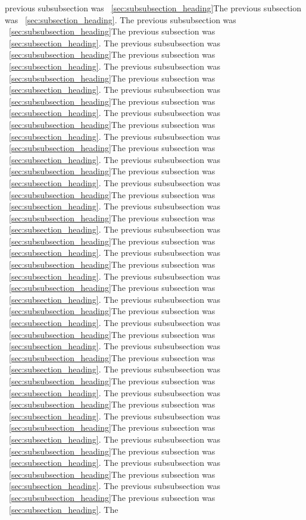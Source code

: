 \documentclass[twocolumn,11pt,twoside]{article}
\begin{document}
previous subsubsection was ~\ref{sec:subsubsection_heading}The previous subsection was ~\ref{sec:subsection_heading}.  The
previous subsubsection was ~\ref{sec:subsubsection_heading}The previous subsection was ~\ref{sec:subsection_heading}.  The
previous subsubsection was ~\ref{sec:subsubsection_heading}The previous subsection was ~\ref{sec:subsection_heading}.  The
previous subsubsection was ~\ref{sec:subsubsection_heading}The previous subsection was ~\ref{sec:subsection_heading}.  The
previous subsubsection was ~\ref{sec:subsubsection_heading}The previous subsection was ~\ref{sec:subsection_heading}.  The
previous subsubsection was ~\ref{sec:subsubsection_heading}The previous subsection was ~\ref{sec:subsection_heading}.  The
previous subsubsection was ~\ref{sec:subsubsection_heading}The previous subsection was ~\ref{sec:subsection_heading}.  The
previous subsubsection was ~\ref{sec:subsubsection_heading}The previous subsection was ~\ref{sec:subsection_heading}.  The
previous subsubsection was ~\ref{sec:subsubsection_heading}The previous subsection was ~\ref{sec:subsection_heading}.  The
previous subsubsection was ~\ref{sec:subsubsection_heading}The previous subsection was ~\ref{sec:subsection_heading}.  The
previous subsubsection was ~\ref{sec:subsubsection_heading}The previous subsection was ~\ref{sec:subsection_heading}.  The
previous subsubsection was ~\ref{sec:subsubsection_heading}The previous subsection was ~\ref{sec:subsection_heading}.  The
previous subsubsection was ~\ref{sec:subsubsection_heading}The previous subsection was ~\ref{sec:subsection_heading}.  The
previous subsubsection was ~\ref{sec:subsubsection_heading}The previous subsection was ~\ref{sec:subsection_heading}.  The
previous subsubsection was ~\ref{sec:subsubsection_heading}The previous subsection was ~\ref{sec:subsection_heading}.  The
previous subsubsection was ~\ref{sec:subsubsection_heading}The previous subsection was ~\ref{sec:subsection_heading}.  The
previous subsubsection was ~\ref{sec:subsubsection_heading}The previous subsection was ~\ref{sec:subsection_heading}.  The
previous subsubsection was ~\ref{sec:subsubsection_heading}The previous subsection was ~\ref{sec:subsection_heading}.  The
previous subsubsection was ~\ref{sec:subsubsection_heading}The previous subsection was ~\ref{sec:subsection_heading}.  The
previous subsubsection was ~\ref{sec:subsubsection_heading}The previous subsection was ~\ref{sec:subsection_heading}.  The
previous subsubsection was ~\ref{sec:subsubsection_heading}The previous subsection was ~\ref{sec:subsection_heading}.  The
previous subsubsection was ~\ref{sec:subsubsection_heading}The previous subsection was ~\ref{sec:subsection_heading}.  The
\end{document}
